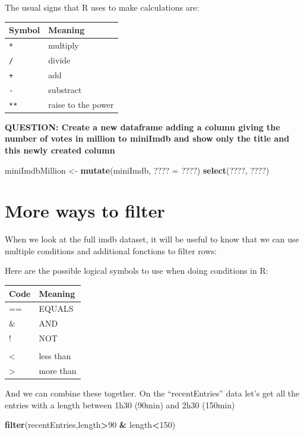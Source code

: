 \documentclass[]{book}
\newenvironment{Shaded}{\begin{snugshade}}{\end{snugshade}}
\newcommand{\DecValTok}[1]{\textcolor[rgb]{0.00,0.00,0.81}{#1}}
\newcommand{\KeywordTok}[1]{\textcolor[rgb]{0.13,0.29,0.53}{\textbf{#1}}}
\newcommand{\NormalTok}[1]{#1}
\newcommand{\OperatorTok}[1]{\textcolor[rgb]{0.81,0.36,0.00}{\textbf{#1}}}
\newcommand{\StringTok}[1]{\textcolor[rgb]{0.31,0.60,0.02}{#1}}
\begin{document}
The usual signs that R uses to make calculations are:

\begin{longtable}[]{@{}ll@{}}
\toprule
\textbf{Symbol} & \textbf{Meaning}\tabularnewline
\midrule
\endhead
\texttt{*} & multiply\tabularnewline
\texttt{/} & divide\tabularnewline
\texttt{+} & add\tabularnewline
\texttt{-} & substract\tabularnewline
\texttt{**} & raise to the power\tabularnewline
\bottomrule
\end{longtable}

\textbf{QUESTION: Create a new dataframe adding a column giving the number of votes in million to miniImdb and show only the title and this newly created column}

\begin{Shaded}
\begin{Highlighting}[]
\NormalTok{miniImdbMillion <-}\StringTok{ }\KeywordTok{mutate}\NormalTok{(miniImdb, ???? =}\StringTok{ }\NormalTok{????)}
\KeywordTok{select}\NormalTok{(????, ????)}
\end{Highlighting}
\end{Shaded}

\hypertarget{more-ways-to-filter}{%
\section{More ways to filter}\label{more-ways-to-filter}}

When we look at the full imdb dataset, it will be useful to know that we can use multiple conditions and additional fonctions to filter rows:

Here are the possible logical symbols to use when doing conditions in R:

\begin{longtable}[]{@{}ll@{}}
\toprule
\textbf{Code} & \textbf{Meaning}\tabularnewline
\midrule
\endhead
== & EQUALS\tabularnewline
\& & AND\tabularnewline
! & NOT\tabularnewline
&\tabularnewline
\textless{} & less than\tabularnewline
\textgreater{} & more than\tabularnewline
\bottomrule
\end{longtable}

And we can combine these together. On the ``recentEntries'' data let's get all the entries with a length between 1h30 (90min) and 2h30 (150min)

\begin{Shaded}
\begin{Highlighting}[]
\KeywordTok{filter}\NormalTok{(recentEntries,length}\OperatorTok{>}\DecValTok{90} \OperatorTok{&}\StringTok{ }\NormalTok{length}\OperatorTok{<}\DecValTok{150}\NormalTok{)}
\end{Highlighting}
\end{Shaded}
\end{document}
